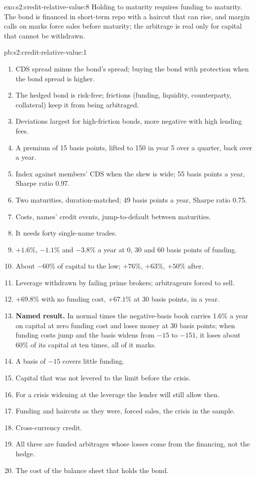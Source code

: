 \begin{solution}{exo:s2:credit-relative-value:8}
Holding to maturity requires funding to maturity. The bond is financed in short-term repo with a haircut that can rise, and margin calls on marks
force sales before maturity; the arbitrage is real only for capital that cannot be withdrawn.
\end{solution}

\begin{solution}{pb:s2:credit-relative-value:1}
\begin{enumerate}
\item CDS spread minus the bond's spread; buying the bond with protection when the bond spread is higher.
\item The hedged bond is risk-free; frictions (funding, liquidity, counterparty, collateral) keep it from being arbitraged.
\item Deviations largest for high-friction bonds, more negative with high lending fees.
\item A premium of 15 basis points, lifted to 150 in year 5 over a quarter, back over a year.
\item Index against members' CDS when the skew is wide; 55 basis points a year, Sharpe ratio 0.97.
\item Two maturities, duration-matched; 49 basis points a year, Sharpe ratio 0.75.
\item Costs, names' credit events, jump-to-default between maturities.
\item It needs forty single-name trades.
\item $+1.6\%$, $-1.1\%$ and $-3.8\%$ a year at 0, 30 and 60 basis points of funding.
\item About $-60\%$ of capital to the low; $+76\%$, $+63\%$, $+50\%$ after.
\item Leverage withdrawn by failing prime brokers; arbitrageurs forced to sell.
\item $+69.8\%$ with no funding cost, $+67.1\%$ at 30 basis points, in a year.
\item \textbf{Named result.} In normal times the negative-basis book carries 1.6\% a year on capital at zero funding cost and loses money at 30 basis
points; when funding costs jump and the basis widens from $-15$ to $-151$, it loses about 60\% of its capital at ten times, all of it marks.
\item A basis of $-15$ covers little funding.
\item Capital that was not levered to the limit before the crisis.
\item For a crisis widening at the leverage the lender will still allow then.
\item Funding and haircuts as they were, forced sales, the crisis in the sample.
\item Cross-currency credit.
\item All three are funded arbitrages whose losses come from the financing, not the hedge.
\item The cost of the balance sheet that holds the bond.
\end{enumerate}
\end{solution}

